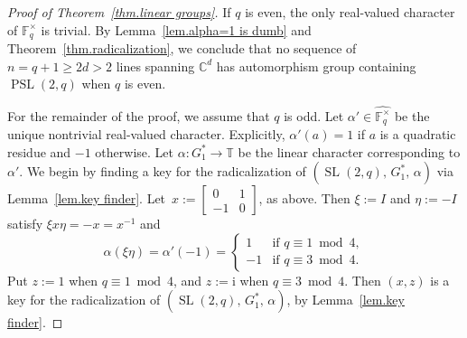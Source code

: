 \begin{proof}[Proof of Theorem~\ref{thm.linear groups}]
If $q$ is even, the only real-valued character of $\mathbb{F}_q^\times$ is trivial.
By Lemma~\ref{lem.alpha=1 is dumb} and Theorem~\ref{thm.radicalization}, we conclude that no sequence of $n = q+1 \geq 2d > 2$ lines spanning $\mathbb{C}^d$ has automorphism group containing $\operatorname{PSL}(2,q)$ when $q$ is even.

For the remainder of the proof, we assume that $q$ is odd.
Let $\alpha' \in \widehat{ \mathbb{F}_q^\times }$ be the unique nontrivial real-valued character.
Explicitly, $\alpha'(a) = 1$ if $a$ is a quadratic residue and $-1$ otherwise.
Let $\alpha \colon G_1^* \to \mathbb{T}$ be the linear character corresponding to $\alpha'$.
We begin by finding a key for the radicalization of $( \operatorname{SL}(2,q),\, G_1^*,\, \alpha)$ via Lemma~\ref{lem.key finder}.
Let~$x := \begin{bmatrix} 0 & 1 \\ -1 & 0 \end{bmatrix}$, as above.
Then $\xi := I$ and $\eta := -I$ satisfy $\xi x \eta = -x = x^{-1}$ and
\[ \alpha(\xi \eta) = \alpha'(-1)=
\begin{cases}
1 & \text{if } q \equiv 1 \bmod 4, \\
-1 & \text{if } q \equiv 3 \bmod 4.
\end{cases}
\]
Put $z :=1$ when $q \equiv 1 \bmod 4$, and $z:=\mathrm{i}$ when $q \equiv 3 \bmod 4$.
Then $(x,z)$ is a key for the radicalization of $( \operatorname{SL}(2,q),\, G_1^*,\, \alpha)$, by Lemma~\ref{lem.key finder}.



\end{proof}
